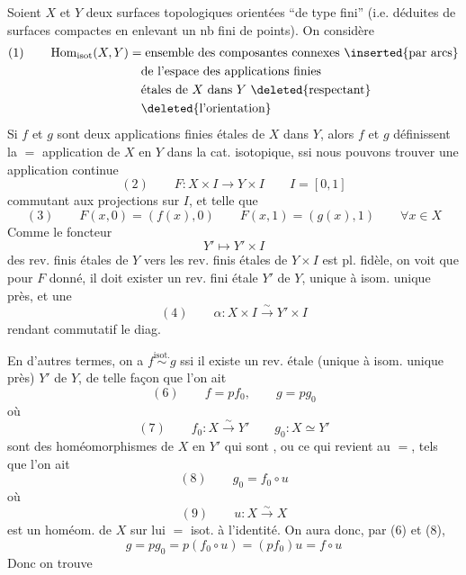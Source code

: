 Soient $X$ et $Y$ deux surfaces topologiques orientées  ``de type fini'' (i.e. déduites de surfaces compactes en enlevant un nb fini de points). On considère
\[
\begin{aligned}
(1)\qquad \operatorname{Hom}_{\mathrm{isot}}(X,Y)
&=\text{ensemble des composantes connexes \inserted{par arcs}}\\
&\quad\text{de l'espace des applications finies}\\
&\quad\text{étales de $X$ dans $Y$ \deleted{respectant}}\\
&\quad\deleted{\text{l'orientation}}
\end{aligned}
\]
Si $f$ et $g$ sont deux applications finies étales de $X$ dans $Y$, alors $f$ et $g$  définissent la $=$  application de $X$ en $Y$ dans la cat. isotopique, ssi nous pouvons trouver une application continue 
\[
(2)\qquad F:X\times I\longrightarrow Y\times I\qquad I=[0,1]
\]
commutant aux projections sur $I$, et telle que
\[
(3)\qquad F(x,0)=(f(x),0)\qquad F(x,1)=(g(x),1)\qquad\forall x\in X
\]
Comme le foncteur
\[
Y'\longmapsto Y'\times I
\]
des rev. finis étales de $Y$ vers les rev. finis étales de $Y\times I$ est pl. fidèle, on voit que  pour $F$ donné, il doit exister un rev. fini étale $Y'$ de $Y$, unique à isom. unique près, et une 
\[
(4)\qquad \alpha:X\times I\xrightarrow{\sim}Y'\times I
\]
rendant commutatif le diag. 

En d'autres termes, on a $f\overset{\mathrm{isot.}}{\sim}g$ ssi il existe un rev.  étale (unique à isom. unique près) $Y'$ de $Y$, de telle façon que l'on ait
\[
(6)\qquad f=pf_0,\qquad g=pg_0
\]
où
\[
(7)\qquad f_0:X\xrightarrow{\sim}Y'\qquad g_0:X\simeq Y'
\]
sont des homéomorphismes de $X$ en $Y'$ qui sont , ou ce qui revient au $=$, tels que l'on ait
\[
(8)\qquad g_0=f_0\circ u
\]
où
\[
(9)\qquad u:X\xrightarrow{\sim}X
\]
 est un homéom. de $X$ sur lui $=$ isot. à l'identité. On aura donc, par (6) et (8),
\[
g=pg_0=p(f_0\circ u)=(pf_0)u=f\circ u
\]
Donc on trouve

